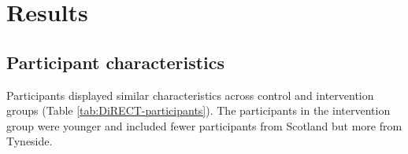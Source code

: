 \documentclass[11pt,twoside]{bristolthesis}
\begin{document}
\hypertarget{results-4}{%
\section{Results}\label{results-4}}

\hypertarget{participant-characteristics-2}{%
\subsection{Participant characteristics}\label{participant-characteristics-2}}

Participants displayed similar characteristics across control and intervention groups (Table \ref{tab:DiRECT-participants}). The participants in the intervention group were younger and included fewer participants from Scotland but more from Tyneside.
\begin{landscape}\begin{table}


\end{table}
\end{landscape}
\end{document}
